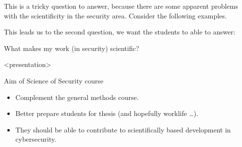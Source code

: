 This is a tricky question to answer, because there are some apparent problems 
with the scientificity in the security area.
Consider the following examples.

\begin{frame}[fragile]
  \begin{example}\label{SoKProblem1}
  \end{example}

  \pause

  \begin{example}\label{SoKProblem2}
  \end{example}
\end{frame}

This leads us to the second question, we want the students to able to answer:

\begin{frame}
  \begin{question}
    What makes my work (in security) scientific?
  \end{question}
\end{frame}

\begin{frame}<presentation>
  \begin{block}{Aim of Science of Security course}
    \begin{itemize}
      \item Complement the general methods course.
      \item Better prepare students for thesis (and hopefully worklife \dots).
      \item They should be able to contribute to scientifically based 
        development in cybersecurity.
    \end{itemize}
  \end{block}
\end{frame}



